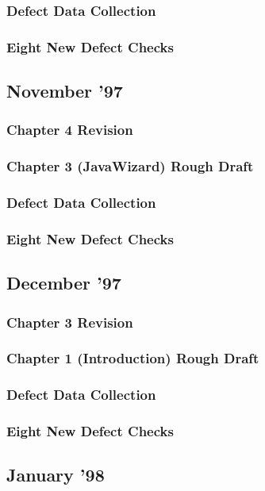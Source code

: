 \subsubsection{Defect Data Collection}
\subsubsection{Eight New Defect Checks}

\subsection{November '97}
\subsubsection{Chapter 4 Revision}
\subsubsection{Chapter 3 (JavaWizard) Rough Draft}
\subsubsection{Defect Data Collection}
\subsubsection{Eight New Defect Checks}

\subsection{December '97}
\subsubsection{Chapter 3 Revision}
\subsubsection{Chapter 1 (Introduction) Rough Draft}
\subsubsection{Defect Data Collection}
\subsubsection{Eight New Defect Checks}

\subsection{January '98}
